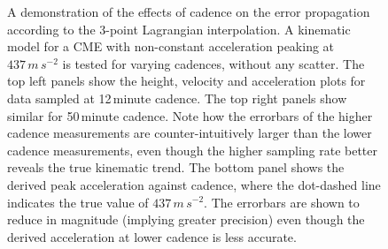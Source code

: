 \documentclass[structabstract]{aa}
\begin{document}
\begin{figure}[!t]
\caption{A demonstration of the effects of cadence on the error propagation according to the 3-point Lagrangian interpolation. A kinematic model for a CME with non-constant acceleration peaking at $437\,m\,s^{-2}$ is tested for varying cadences, without any scatter. The top left panels show the height, velocity and acceleration plots for data sampled at 12\,minute cadence. The top right panels show similar for 50\,minute cadence. Note how the errorbars of the higher cadence measurements are counter-intuitively larger than the lower cadence measurements, even though the higher sampling rate better reveals the true kinematic trend. The bottom panel shows the derived peak acceleration against cadence, where the dot-dashed line indicates the true value of $437\,m\,s^{-2}$. The errorbars are shown to reduce in magnitude (implying greater precision) even though the derived acceleration at lower cadence is less accurate.}
\label{fig_cadence_hva}
\end{figure}
\end{document}
